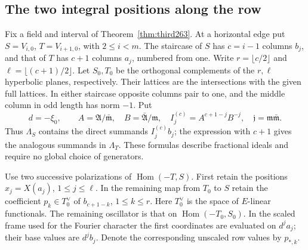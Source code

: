 \documentclass[a4paper,11pt]{article}
\theoremstyle{definition}
\theoremstyle{remark}
\numberwithin{equation}{section}
\begin{document}
\subsection{The two integral positions along the row}\label{nav:I-56}
Fix a field and interval of Theorem~\ref{thm:third263}. At a
horizontal edge put \(S=V_{i,0}\), \(T=V_{i+1,0}\), with
\(2\le i<m\). The staircase of \(S\) has \(c=i-1\) columns
\(b_j\), and that of \(T\) has \(c+1\) columns \(a_j\), numbered
from one. Write \(r=\lfloor c/2\rfloor\) and
\(\ell=\lfloor(c+1)/2\rfloor\). Let \(S_0,T_0\) be the orthogonal
complements of the \(r,\ell\) hyperbolic planes, respectively.
Their lattices are the intersections with the given full lattices.
In either staircase opposite columns pair to one, and the middle
column in odd length has norm \(-1\). Put
\[
 d=-\xi_0,\qquad A=\mathfrak A/\bar{\mathfrak m},\quad
 B=\bar{\mathfrak A}/\mathfrak m,\quad
 I_j^{(c)}=A^{c+1-j}B^{-j},\quad
 \mathfrak j=\mathfrak m\bar{\mathfrak m}.
\]
Thus \(\Lambda_S\) contains the direct summands \(I_j^{(c)}b_j\);
the expression with \(c+1\) gives the analogous summands in
\(\Lambda_T\). These formulas describe fractional ideals and
require no global choice of generators.

Use two successive polarizations of \(\operatorname{Hom}(-T,S)\).
First retain the positions \(x_j=X(a_j)\), \(1\le j\le\ell\).
In the remaining map from \(T_0\) to \(S\) retain the coefficient
\(p_k\in T_0^\vee\) of \(b_{c+1-k}\), \(1\le k\le r\). Here
\(T_0^\vee\) is the space of \(E\)-linear functionals. The
remaining oscillator is that on \(\operatorname{Hom}(-T_0,S_0)\).
In the scaled frame used for the Fourier character the first
coordinates are evaluated on \(d^j a_j\); their base values are
\(d^j b_j\). Denote the corresponding unscaled row values by
\(p_{*,k}\).
\end{document}
